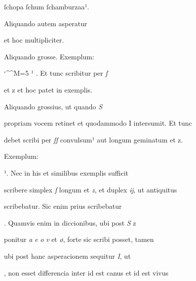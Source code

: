 ſchopa ſchum ſchamburzaa¹.

\indentK Aliquando autem asperatur

\splitlines

et hoc multipliciter.

\indentK Aliquando grosse. Exemplum:  

\fulllines

\catcode `\^^M=5
\obeylines
{}  ¹ . Et tunc scribitur per \textit{ſ} 

\splitlines

 et z et hoc patet in exemplis.

Aliquando grossius, ut quando \textit{S}

\fulllines

propriam vocem retinet et quodammodo I intersumit. Et tunc 

debet scribi per \textit{ſſ} convulsum¹ aut longum geminatum et z. 


Exemplum:      

 ¹. Nec in his et similibus exemplis sufficit 


scribere simplex \textit{ſ} longum et \textit{z}, et duplex \textit{ĳ}, ut antiquitus 

scribebatur. Sic enim prius scribebatur  

. Quamvis enim in diccionibus, ubi post \textit{S} z 


ponitur \textit{a} \textit{e} \textit{o} \textit{v} et \textit{ø}, forte sic scribi posset, tamen 

ubi post hanc asperacionem sequitur \textit{I}, ut  

, non esset differencia inter  id est canus et  id est vivus 

